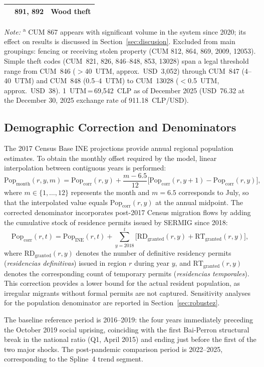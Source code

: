 \documentclass[pdflatex,sn-basic]{sn-jnl}
\newcommand{\tablenote}[1]{%
  \vspace{2pt}%
  {\par\footnotesize\textit{Note:} #1\par}%
}
\begin{document}
\begin{table}[htbp]
{\begin{tabular}{p{3.5cm}rp{7cm}}
 & 891, 892 & Wood theft \\
\bottomrule
\end{tabular}
}
\tablenote{\textsuperscript{a} CUM 867 appears with significant volume in the system since 2020; its effect on results is discussed in Section~\ref{sec:discusion}. Excluded from main groupings: fencing or receiving stolen property (CUM 812, 864, 869, 2009, 12053). Simple theft codes (CUM~821, 826, 846--848, 853, 13028) span a legal threshold range from CUM~846 ($>$40~UTM, approx.\ USD~3,052) through CUM~847 (4--40~UTM) and CUM~848 (0.5--4~UTM) to CUM~13028 ($<$0.5~UTM, approx.\ USD~38). 1~UTM\,=\,69,542~CLP as of December 2025 (USD~76.32 at the December 30, 2025 exchange rate of 911.18~CLP/USD).}
\end{table}

\subsection{Demographic Correction and Denominators}
\label{sub:pop}

The 2017 Census Base INE projections provide annual regional population estimates. To obtain the monthly offset required by the model, linear interpolation between contiguous years is performed:
\[
  \text{Pop}_{\text{month}}(r,y,m)
  = \text{Pop}_{\text{corr}}(r,y)
  + \frac{m - 6.5}{12}
  \bigl[\text{Pop}_{\text{corr}}(r,y+1) - \text{Pop}_{\text{corr}}(r,y)\bigr],
\]
where $m \in \{1,\ldots,12\}$ represents the month and $m=6.5$ corresponds to July, so that the interpolated value equals $\text{Pop}_{\text{corr}}(r,y)$ at the annual midpoint. The corrected denominator incorporates post-2017 Census migration flows by adding the cumulative stock of residence permits issued by SERMIG since 2018:
\[
  \text{Pop}_{\text{corr}}(r,t)
  = \text{Pop}_{\text{INE}}(r,t)
  + \sum_{y=2018}^{t}\bigl[\text{RD}_{\text{granted}}(r,y) + \text{RT}_{\text{granted}}(r,y)\bigr],
\]
where $\text{RD}_{\text{granted}}(r,y)$ denotes the number of definitive residency permits (\textit{residencias definitivas}) issued in region $r$ during year $y$, and $\text{RT}_{\text{granted}}(r,y)$ denotes the corresponding count of temporary permits (\textit{residencias temporales}). This correction provides a lower bound for the actual resident population, as irregular migrants without formal permits are not captured. Sensitivity analyses for the population denominator are reported in Section~\ref{sec:robustez}.

The baseline reference period is 2016--2019: the four years immediately preceding the October 2019 social uprising, coinciding with the first Bai-Perron structural break in the national ratio (Q1, April 2015) and ending just before the first of the two major shocks. The post-pandemic comparison period is 2022--2025, corresponding to the Spline~4 trend segment.
\end{document}

